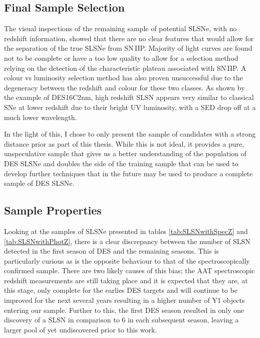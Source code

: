 \subsection{Final Sample Selection}
The visual inspections of the remaining sample of potential SLSNe, with no redshift information, showed that there are no clear features that would allow for the separation of the true SLSNe from SN\,IIP. Majority of light curves are found not to be complete or have a too low quality to allow for a selection method relying on the detection of the characteristic plateau associated with SN\,IIP. A colour vs luminosity selection method has also proven unsuccessful due to the degeneracy between the redshift and colour for these two classes. As shown by the example of DES16C2nm, high redshift SLSN appears very similar to classical SNe at lower redshift due to their bright UV luminosity, with a SED drop off at a much lower wavelength.

In the light of this, I chose to only present the sample of candidates with a strong distance prior as part of this thesis. While this is not ideal, it provides a pure, unspeculative sample that gives us a better understanding of the population of DES SLSNe and doubles the side of the training sample that can be used to develop further techniques that in the future may be used to produce a complete sample of DES SLSNe.

\subsection{Sample Properties}
Looking at the samples of SLSNe presented in tables \ref{tab:SLSNwithSpecZ} and \ref{tab:SLSNwithPhotZ}, there is a clear discrepancy between the number of SLSN detected in the first season of DES and the remaining seasons. This is particularly curious as is the opposite behaviour to that of the spectroscopically confirmed sample. There are two likely causes of this bias; the AAT spectroscopic redshift measurements are still taking place and it is expected that they are, at this stage, only complete for the earlies DES targets and will continue to be improved for the next several years resulting in a higher number of Y1 objects entering our sample. Further to this, the first DES season resulted in only one discovery of a SLSN in comparison to 6 in each subsequent season, leaving a larger pool of yet undiscovered prior to this work.

